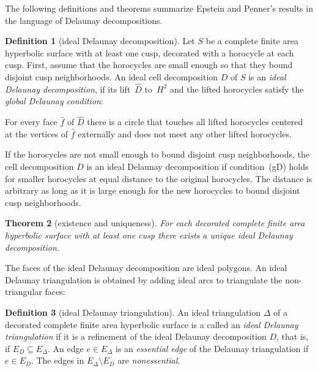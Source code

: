\documentclass[a4paper, 11pt]{article}
\theoremstyle{plain}
\newtheorem{theorem}{Theorem}[section]
\theoremstyle{definition}
\newtheorem{definition}[theorem]{Definition}
\begin{document}
The following definitions and theorems summarize Epstein
and Penner's results in the language of Delaunay decompositions.

\begin{definition}[ideal Delaunay decomposition]
  \label{def:idealdel}
  Let $S$ be a complete finite area hyperbolic surface with at least
  one cusp, decorated with a horocycle at each cusp. First, assume
  that the horocycles are small enough so that they bound disjoint
  cusp neighborhoods. An ideal cell decomposition $D$ of $S$ is an
  \emph{ideal Delaunay decomposition}, if its lift~$\hat{D}$ to~$H^{2}$
  and the lifted horocycles satisfy the \emph{global Delaunay
    condition}:
  \begin{compactitem}[(gD)]
  \item For every face $\hat{f}$ of $\hat{D}$ there is a circle that
    touches all lifted horocycles centered at the vertices of
    $\hat{f}$ externally and does not meet any other lifted
    horocycles.
  \end{compactitem}
  If the horocycles are not small enough to bound disjoint cusp
  neighborhoods, the cell decomposition $D$ is an ideal Delaunay
  decomposition if condition~(gD) holds for smaller horocycles at
  equal distance to the original horocycles. The distance is arbitrary
  as long as it is large enough for the new horocycles to bound
  disjoint cusp neighborhoods.
\end{definition}

\begin{theorem}[existence and uniqueness]
  \label{thm:idealdel}
  For each decorated complete finite area hyperbolic surface with at
  least one cusp there exists a unique ideal Delaunay
  decomposition. %
\end{theorem}

The faces of the ideal Delaunay decomposition are ideal polygons. An
ideal Delaunay triangulation is obtained by adding ideal arcs to
triangulate the non-triangular faces:

\begin{definition}[ideal Delaunay triangulation]
  \label{def:deltriang}
  An ideal triangulation $\Delta$ of a decorated complete finite area
  hyperbolic surface is a called an \emph{ideal Delaunay
    triangulation} if it is a refinement of the ideal Delaunay
  decomposition $D$, that is, if $E_{D}\subseteq E_{\Delta}$. An edge
  $e\in E_{\Delta}$ is an \emph{essential edge} of the Delaunay
  triangulation if $e\in E_{D}$. The edges in
  $E_{\Delta}\setminus E_{D}$ are \emph{nonessential}.
\end{definition}
\end{document}
